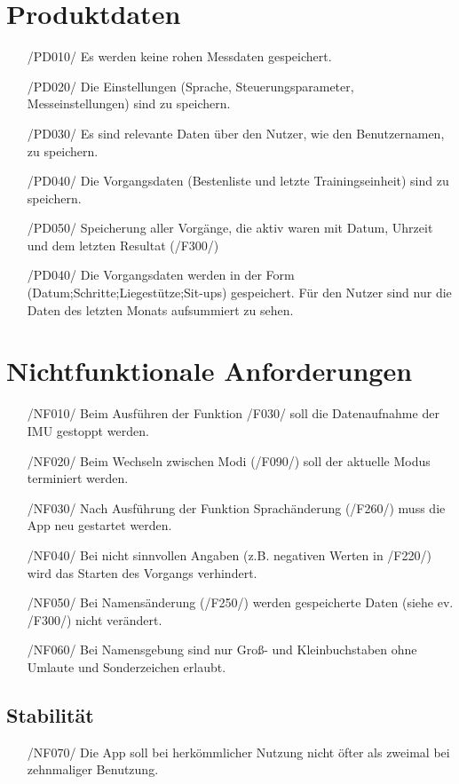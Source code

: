 \documentclass[a4paper,12pt]{article}
\begin{document}
\section{Produktdaten}
\begin{itemize}
	\item[/PD010/] Es werden keine rohen Messdaten gespeichert.
	\item[/PD020/] Die Einstellungen (Sprache, \Gls{Steuerungsparameter}, Messeinstellungen) sind zu speichern. 
	\item[/PD030/] Es sind relevante Daten über den Nutzer, wie den Benutzernamen, zu speichern.
	\item[/PD040/] Die \Gls{Vorgangsdaten} (Bestenliste und letzte Trainingseinheit) sind zu speichern. %
	\item[/PD050/] Speicherung aller Vorgänge, die aktiv waren mit Datum, Uhrzeit und dem letzten Resultat (/F300/)%
	\item[/PD040/] Die Vorgangsdaten werden in der Form (Datum;Schritte;Liegestütze;Sit-ups) gespeichert. Für den Nutzer sind nur die Daten des letzten Monats aufsummiert zu sehen.
\end{itemize}


\section{Nichtfunktionale Anforderungen}

\begin{itemize}
  \item[/NF010/] Beim Ausführen der Funktion /F030/ soll die Datenaufnahme der \Gls{IMU} gestoppt werden.
  \item[/NF020/] Beim Wechseln zwischen Modi (/F090/) soll der aktuelle Modus terminiert werden.
  \item[/NF030/] Nach Ausführung der Funktion  Sprachänderung (/F260/) muss die App neu gestartet werden.
  \item[/NF040/] Bei nicht sinnvollen Angaben (z.B. negativen Werten in /F220/) wird das Starten des Vorgangs verhindert.
  \item[/NF050/] Bei Namensänderung (/F250/) werden gespeicherte Daten (siehe ev. /F300/) nicht verändert.
  \item[/NF060/] Bei Namensgebung sind nur Groß- und Kleinbuchstaben ohne Umlaute und Sonderzeichen erlaubt.
\end{itemize}
\subsection{Stabilität}
\begin{itemize}
  \item[/NF070/] Die App soll bei herkömmlicher Nutzung nicht öfter als zweimal bei zehnmaliger Benutzung. %
\end{itemize}
\end{document}
